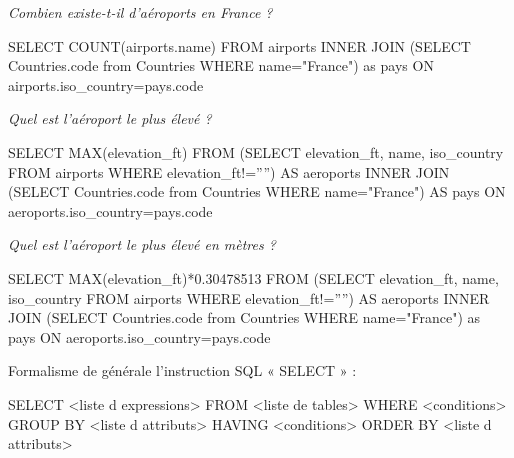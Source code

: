 \documentclass[10pt]{article}
\begin{document}
\begin{exemple}
\textit{Combien existe-t-il d'aéroports en France ?}

\begin{envsql}
\begin{sql}
SELECT COUNT(airports.name) 
        FROM airports 
    INNER JOIN 
        (SELECT Countries.code from Countries WHERE name="France") as pays 
    ON airports.iso_country=pays.code
\end{sql}
\end{envsql}

\textit{Quel est l'aéroport le plus élevé ?}
\begin{envsql}
\begin{sql}
SELECT MAX(elevation_ft) FROM 
    (SELECT elevation_ft, name, iso_country FROM airports WHERE elevation_ft!='''') AS aeroports
    INNER JOIN 
    (SELECT Countries.code from Countries WHERE name="France") AS pays     
        ON aeroports.iso_country=pays.code
\end{sql}
\end{envsql}

\textit{Quel est l'aéroport le plus élevé en mètres ?}
\begin{envsql}
\begin{sql}
SELECT MAX(elevation_ft)*0.30478513 FROM 
    (SELECT elevation_ft, name, iso_country FROM airports WHERE elevation_ft!='''') AS aeroports 
    INNER JOIN 
    (SELECT Countries.code from Countries WHERE name="France") as pays 
        ON aeroports.iso_country=pays.code
\end{sql}
\end{envsql}

\end{exemple}


\begin{rem}
Formalisme de générale l’instruction SQL « SELECT » :
\begin{envsql}
\begin{sql}
SELECT <liste d expressions> 
    FROM <liste de tables> 
    WHERE <conditions> 
    GROUP BY <liste d attributs> 
    HAVING <conditions> 
    ORDER BY <liste d attributs> 
\end{sql}
\end{envsql}
\end{rem}
\end{document}
